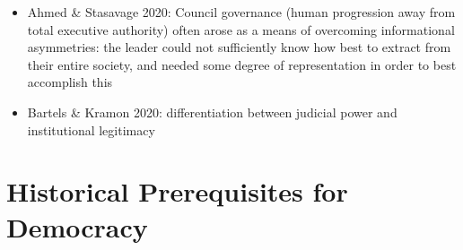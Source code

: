 \documentclass[12pt]{article}
\begin{document}
\begin{itemize}
\begin{itemize}
    \end{itemize}
    \item Ahmed \& Stasavage 2020: Council governance (human progression away from total executive authority) often arose as a means of overcoming informational asymmetries: the leader could not sufficiently know how best to extract from their entire society, and needed some degree of representation in order to best accomplish this
    \item Bartels \& Kramon 2020: differentiation between judicial power and institutional legitimacy
\end{itemize}




\section*{Historical Prerequisites for Democracy}
\end{document}
